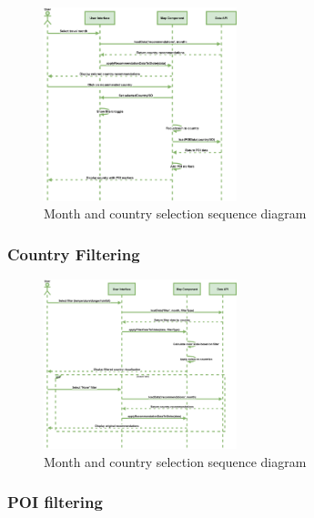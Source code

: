 \documentclass[]{project_final}
\begin{document}
\begin{figure}[ht!]
    \centering
    \includegraphics[width=0.5\textwidth]{MonthandcountryselectionsSequence.png}
    \vspace*{0.0cm}
    \caption{Month and country selection sequence diagram}
    \label{fig:1}
\end{figure}
\newpage
\subsubsection{Country Filtering}

\begin{figure}[ht!]
    \centering
    \includegraphics[width=0.5\textwidth]{countryFiltering.png}
    \vspace*{0.0cm}
    \caption{Month and country selection sequence diagram}
    \label{fig:1}
\end{figure}
\newpage
\subsubsection{POI filtering}
\end{document}
